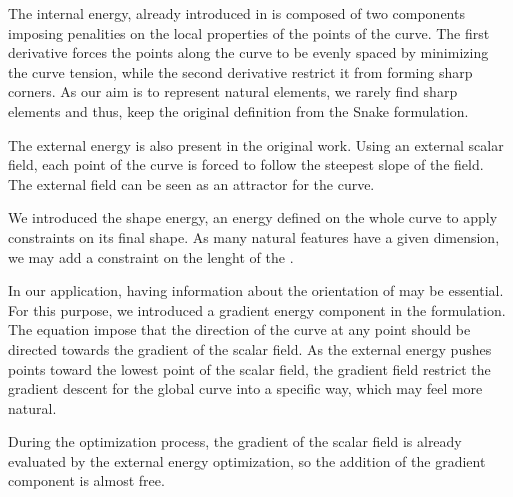 The internal energy, already introduced in \citep{Kass1988} is composed of two components imposing penalities on the local properties of the points of the curve. The first derivative forces the points along the curve to be evenly spaced by minimizing the curve tension, while the second derivative restrict it from forming sharp corners. As our aim is to represent natural elements, we rarely find sharp elements and thus, keep the original definition from the Snake formulation.

The external energy is also present in the original work. Using an external scalar field, each point of the curve is forced to follow the steepest slope of the field. The external field can be seen as an attractor for the curve.

We introduced the shape energy, an energy defined on the whole curve to apply constraints on its final shape. As many natural features have a given dimension, we may add a constraint on the lenght of the . 

In our application, having information about the orientation of  may be essential. For this purpose, we introduced a gradient energy component in the formulation. The equation impose that the direction of the curve at any point should be directed towards the gradient of the scalar field. As the external energy pushes points toward the lowest point of the scalar field, the gradient field restrict the gradient descent for the global curve into a specific way, which may feel more natural.

During the optimization process, the gradient of the scalar field is already evaluated by the external energy optimization, so the addition of the gradient component is almost free.




